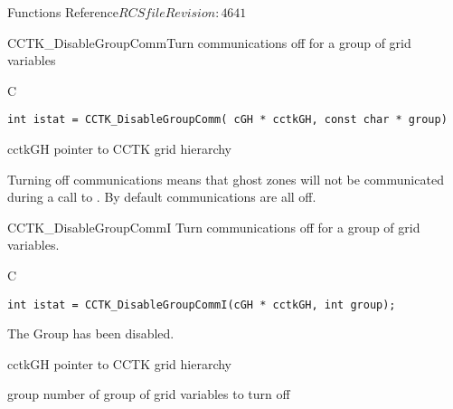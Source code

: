 \begin{cactuspart}{ Functions Reference}{$RCSfile$}{$Revision: 4641 $}
\begin{FunctionDescription}{CCTK\_DisableGroupComm}{Turn communications off for a group of grid variables}
\label{CCTK-DisableGroupComm}
\begin{SynopsisSection}
\begin{Synopsis}{C}
\begin{verbatim}int istat = CCTK_DisableGroupComm( cGH * cctkGH, const char * group)\end{verbatim}
\end{Synopsis}
\end{SynopsisSection}
\begin{ParameterSection}
\begin{Parameter}{cctkGH}
pointer to CCTK grid hierarchy
\end{Parameter}
\end{ParameterSection}
\begin{Discussion}
Turning off communications means that ghost zones will not be
communicated during a call to . By default
communications are all off.
\end{Discussion}
\end{FunctionDescription}

\begin{FunctionDescription}{CCTK\_DisableGroupCommI}
\label{CCTK-DisableGroupCommI}
Turn communications off for a group of grid variables.
\begin{SynopsisSection}
\begin{Synopsis}{C}
\begin{verbatim}
int istat = CCTK_DisableGroupCommI(cGH * cctkGH, int group);
\end{verbatim}
\end{Synopsis}
\end{SynopsisSection}

\begin{ResultSection}
\begin{Result}{0}
The Group has been disabled.
\end{Result}
\end{ResultSection}

\begin{ParameterSection}
\begin{Parameter}{cctkGH}
pointer to CCTK grid hierarchy
\end{Parameter}
\begin{Parameter}{group}
number of group of grid variables to turn off
\end{Parameter}
\end{ParameterSection}


\end{FunctionDescription}
\end{cactuspart}
